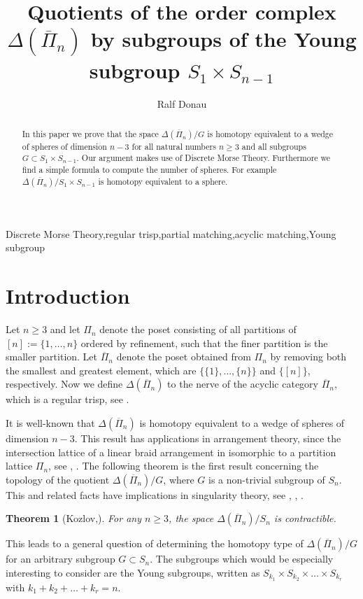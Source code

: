 \documentclass{elsarticle}
\newtheorem{thm}[df]{Theorem}
\begin{document}
\begin{frontmatter}
\title{Quotients of the order complex $\Delta(\overline{\Pi}_n)$ by subgroups of the Young subgroup $S_1\times S_{n-1}$}
\author[ruelle]{Ralf Donau}
\address[ruelle]{Fachbereich Mathematik, Universit\"at Bremen, 28359 Bremen, Germany}
\begin{abstract}
In this paper we prove that the space $\Delta(\overline{\Pi}_n)/G$ is homotopy equivalent to a wedge of spheres of dimension $n-3$ for all natural numbers $n\geq 3$ and all subgroups $G\subset S_1\times S_{n-1}$. Our argument makes use of Discrete Morse Theory. Furthermore we find a simple formula to compute the number of spheres. For example $\Delta(\overline{\Pi}_n)/S_1\times S_{n-1}$ is homotopy equivalent to a sphere.
\end{abstract}
\begin{keyword}
Discrete Morse Theory\sep regular trisp\sep partial matching\sep acyclic matching\sep Young subgroup
\end{keyword}
\end{frontmatter}
\section{Introduction}
Let $n\geq 3$ and let $\Pi_n$ denote the poset consisting of all partitions of $[n]:=\{1,\dots,n\}$ ordered by refinement, such that the finer partition is the smaller partition. Let $\overline{\Pi}_n$ denote the poset obtained from $\Pi_n$ by removing both the smallest and greatest element, which are $\{\{1\},\dots,\{n\}\}$ and $\{[n]\}$, respectively. Now we define $\Delta(\overline{\Pi}_n)$ to the nerve of the acyclic category $\overline{\Pi}_n$, which is a regular trisp, see \cite[Chapter 10]{buch}.

It is well-known that $\Delta(\overline{\Pi}_n)$ is homotopy equivalent to a wedge of spheres of dimension $n-3$. This result has applications in arrangement theory, since the intersection lattice of a linear braid arrangement in isomorphic to a partition lattice $\Pi_n$, see \cite{braid1}, \cite{braid2}. The following theorem is the first result concerning the topology of the quotient $\Delta(\overline{\Pi}_n)/G$, where $G$ is a non-trivial subgroup of $S_n$. This and related facts have implications in singularity theory, see \cite{sing1}, \cite{sing2}, \cite{sing3}.
\begin{thm}[Kozlov,\cite{clmap}] %
For any $n\geq 3$, the space $\Delta(\overline{\Pi}_n)/S_n$ is contractible.
\end{thm}
This leads to a general question of determining the homotopy type of $\Delta(\overline{\Pi}_n)/G$ for an arbitrary subgroup $G\subset S_n$. The subgroups which would be especially interesting to consider are the Young subgroups, written as $S_{k_1}\times S_{k_2}\times\dots\times S_{k_r}$ with $k_1+k_2+\dots+k_r=n$.
\end{document}
